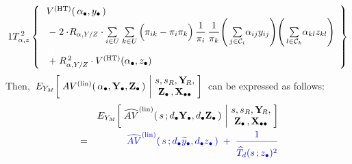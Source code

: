 \begin{lemma}
\begin{enumerate}
\begin{eqnarray*}
{            1
            }{
            \overset{{\color{white}.}}{
                T_{\alpha,z}^{\,2}
                }
            }
        \left\{\,
            \begin{array}{l}
                V^{\textnormal{(HT)}}(\,\abullet,\ydot\,)
                \\
                \; \overset{{\color{white}\textnormal{\Large$1$}}}{-} \;
                2\cdot\!R_{\alpha,Y/Z}
                \cdot
                \underset{i \in U}{\sum}\;
                \underset{k \in U}{\sum}
                \left(\pi_{ik} \overset{{\color{white}.}}{-} \pi_{i}\pi_{k}\right)
                \dfrac{1}{\pi_{i}}
                \,
                \dfrac{1}{\pi_{k}}
                \!
                \left(\,
                    \underset{j\in\mathcal{C}_{i}}{\sum}\alpha_{ij}y_{ij}
                    \right)
                \!
                \left(\,
                    \underset{l\in\mathcal{C}_{k}}{\sum}\alpha_{kl}z_{kl}
                    \right)
                \\
                \; \overset{{\color{white}\textnormal{\Large$1$}}}{+} \;
                R_{\alpha,Y/Z}^{\,2}
                \cdot
                V^{\textnormal{(HT)}}(\abullet,\zdot)
                \end{array}
            \right\}
    \end{eqnarray*}
    Then,
    \,$
    E_{Y_{M}}\!\left[\;
        AV^{\textnormal{(lin)}}(\,\alpha_{\bullet},\mathbf{Y}_{\bullet},\mathbf{Z}_{\bullet}\,)
        \,\left\vert\!
        \begin{array}{c} s,s_{R},\mathbf{Y}_{\!R}, \\ \mathbf{Z}_{\bullet}\,,\mathbf{X}_{\bullet\bullet} \end{array}
        \right.
        \!\!\right]
    $\,
    can be expressed as follows:
    \begin{eqnarray*}
    &&
        E_{Y_{M}}\!\left[\;
            \widehat{AV}^{\textnormal{(lin)}}(\,s\,;\dbullet\Ydot,\dbullet\Zdot\,)
            \,\left\vert\!
            \begin{array}{c} s,s_{R},\YsubR, \\ \Zdot\,,\Xobs \end{array}
            \right.
            \!\!\right]
    \\
    & = &
        {\color{blue}
        \widehat{AV}^{\textnormal{(lin)}}(\,s\,;\dbullet\widetilde{y}_{\bullet},\dbullet\zdot\,)
        \; + \;
        \dfrac{
            1
            }{
            \overset{{\color{white}.}}{
                \widehat{T}_{d}(s\,;\zdot)^{2}
                }
            }
}
\end{eqnarray*}
\end{enumerate}
\end{lemma}
